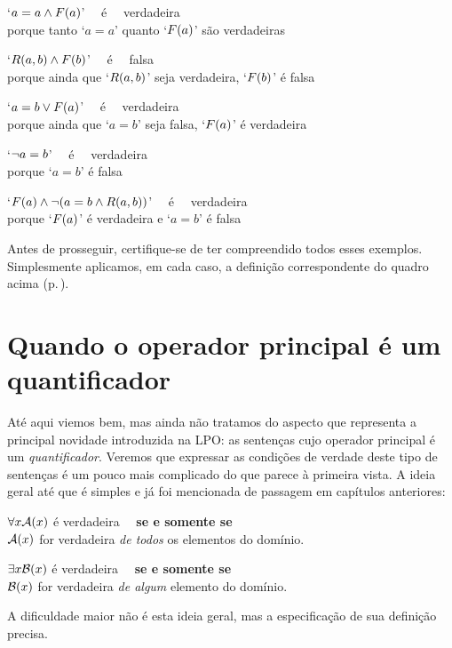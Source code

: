 	\begin{earg}
		\item[\textbullet] `$a = a \wedge \mathord{F}(a)$' \ \ é \ \ verdadeira\\
			porque tanto `$a = a$' quanto `$\mathord{F}(a)$' são verdadeiras\\
		\item[\textbullet] `$\mathord{R}(a,b) \wedge \mathord{F}(b)$' \ \ é \ \ falsa\\
			porque ainda que `$\mathord{R}(a,b)$' seja verdadeira, `$\mathord{F}(b)$' é falsa\\
		\item[\textbullet] `$a = b \vee \mathord{F}(a)$' \ \ é \ \ verdadeira\\
			porque ainda que  `$a = b$' seja falsa, `$\mathord{F}(a)$' é verdadeira\\
		\item[\textbullet] `$\neg a = b$' \ \ é \ \ verdadeira\\
			porque `$a = b$' é falsa\\
		\item[\textbullet] `$\mathord{F}(a) \wedge \neg( a= b \wedge \mathord{R}(a,b))$' \ \ é \ \ verdadeira\\
			porque `$\mathord{F}(a)$' é verdadeira e `$a = b$' é falsa
	\end{earg}
Antes de prosseguir, certifique-se de ter compreendido todos esses exemplos.
Simplesmente aplicamos, em cada caso, a definição correspondente do quadro acima (p.\,\pageref{b:ConSent}). 


\section[Quantificadores]{Quando o operador principal é um quantificador}\label{s:MainLogicalOperatorQuantifier}
Até aqui viemos bem, mas ainda não tratamos do aspecto que representa a principal novidade introduzida na LPO:
as sentenças cujo operador principal é um \emph{quantificador}.
Veremos que expressar as condições de verdade deste tipo de sentenças é um pouco mais complicado do que parece à primeira vista.
A ideia geral até que é simples e já foi mencionada de passagem em capítulos anteriores:
	\begin{earg}
		\item[\textbullet] $\forall x \mathord{\mathcal{A}}(x)$ é verdadeira \ \ \textbf{se e somente se}\\
		$\mathord{\mathcal{A}}(x)$ for verdadeira \textit{de todos} os elementos do domínio.\\
		\item[\textbullet] $\exists x \mathord{\mathcal{B}}(x)$ é verdadeira \ \ \textbf{se e somente se}\\
		$\mathord{\mathcal{B}}(x)$ for verdadeira \textit{de algum} elemento do domínio.
	\end{earg}
A dificuldade maior não é esta ideia geral, mas a especificação de sua definição precisa.

